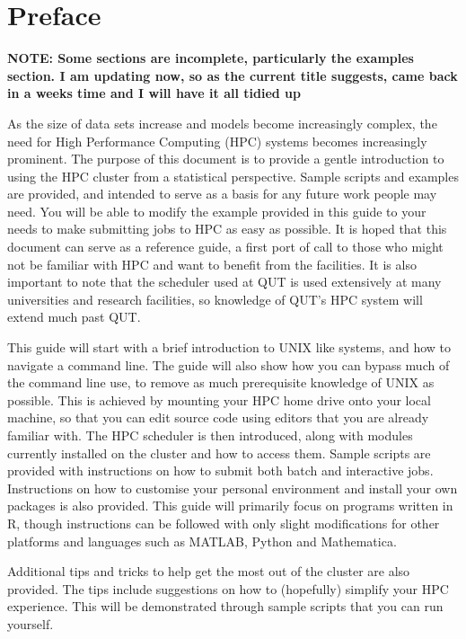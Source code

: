 \section*{Preface}

\textbf{NOTE: Some sections are incomplete, particularly the examples section. I am updating now, so as the current title suggests, came back in a weeks time and I will have it all tidied up \smiley}
%
%
\par
%
%
As the size of data sets increase and models become increasingly complex, the need for High Performance Computing (HPC) systems becomes increasingly prominent. The purpose of this document is to provide a gentle introduction to using the HPC cluster from a statistical perspective. Sample scripts and examples are provided, and intended to serve as a basis for any future work people may need. You will be able to modify the example provided in this guide to your needs to make submitting jobs to HPC as easy as possible. It is hoped that this document can serve as a reference guide, a first port of call to those who might not be familiar with HPC and want to benefit from the facilities. It is also important to note that the scheduler used at QUT is used extensively at many universities and research facilities, so knowledge of QUT's HPC system will extend much past QUT.
%
%
\par
%
%
This guide will start with a brief introduction to UNIX like systems, and how to navigate a command line. The guide will also show how you can bypass much of the command line use, to remove as much prerequisite knowledge of UNIX as possible. This is achieved by mounting your HPC home drive onto your local machine, so that you can edit source code using editors that you are already familiar with. The HPC scheduler is then introduced, along with modules currently installed on the cluster and how to access them. Sample scripts are provided with instructions on how to submit both batch and interactive jobs. Instructions on how to customise your personal environment and install your own packages is also provided. This guide will primarily focus on programs written in R, though instructions can be followed with only slight modifications for other platforms and languages such as MATLAB, Python and Mathematica.
%
%
\par
%
%
Additional tips and tricks to help get the most out of the cluster are also provided. The tips include suggestions on how to (hopefully) simplify your HPC experience. This will be demonstrated through sample scripts that you can run yourself.
